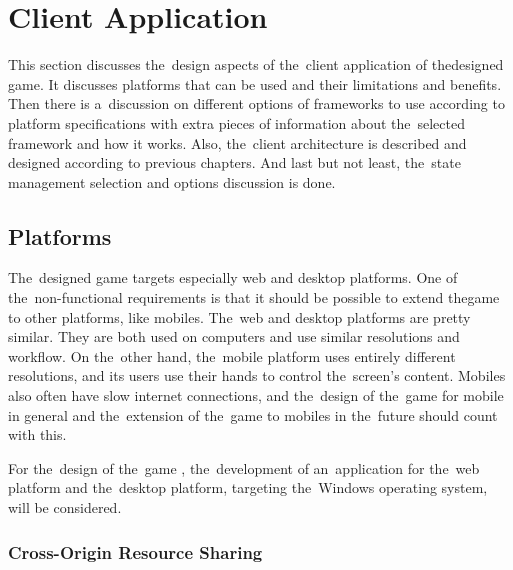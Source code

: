 \section{Client Application}
\label{design:client-application}

This section discusses the~design aspects of the~client application of the\linebreak{}designed game.
It discusses platforms that can be used and their limitations and benefits.
Then there is a~discussion on different options of frameworks to use according to platform specifications with extra pieces of information about the~selected framework and how it works.
Also, the~client architecture is described and designed according to previous chapters. 
And last but not least, the~state management selection and options discussion is done.

\subsection{Platforms}

The~designed game targets especially web and desktop platforms.
One of the~non-functional requirements is that it should be possible to extend the\linebreak{}game to other platforms, like mobiles.
The~web and desktop platforms are pretty similar.
They are both used on computers and use similar resolutions and workflow.
On the~other hand, the~mobile platform uses entirely different resolutions, and its users use their hands to control the~screen's content.
Mobiles also often have slow internet connections, and the~design of the~game for mobile in general and the~extension of the~game to mobiles in the~future should count with this.

For the~design of the~game \myAppName{}, the~development of an~application for the~web platform and the~desktop platform, targeting the~Windows operating system, will be considered.

\subsubsection{Cross-Origin Resource Sharing}

